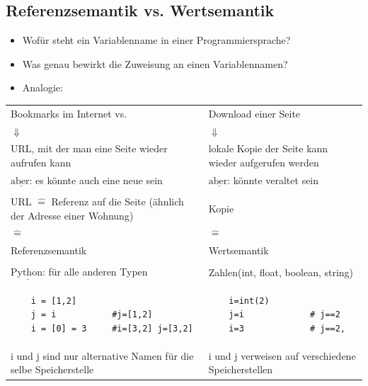 \documentclass[11pt, fleqn]{scrreprt}
\begin{document}
\subsection*{Referenzsemantik vs. Wertsemantik}
    \begin{itemize}[label={-}]
        \item Wofür steht ein Variablenname in einer Programmiersprache?
        \item Was genau bewirkt die Zuweisung an einen Variablennamen?
        \item Analogie:
    \end{itemize}
    \begin{tabular}{C{7cm} C{7cm}}
    Bookmarks im Internet \hspace*{1cm}vs. &  Download einer Seite \\
    $\Downarrow$ & $\Downarrow$ \\
    URL, mit der man eine Seite wieder aufrufen kann & lokale Kopie der Seite
    kann wieder aufgerufen werden \\
    $\underline{\text{aber:}}$ es könnte auch eine neue sein & $\underline{\text{aber:}}$ könnte veraltet sein \\
    & \\
    URL $\widehat{=}$ Referenz auf die Seite (ähnlich der Adresse einer Wohnung) & Kopie \\
    $\widehat{=}$ & $\widehat{=}$ \\
    Referenzsemantik & Wertsemantik \\
     & \\
    $ \underline{\text{Python:}}$ für alle anderen Typen & Zahlen(int, float, boolean, string)\\
    \begin{verbatim}
    i = [1,2]
    j = i           #j=[1,2]
    i = [0] = 3     #i=[3,2] j=[3,2]
    \end{verbatim}
                                                         &
    \begin{verbatim}
    i=int(2)
    j=i             # j==2
    i=3             # j==2,
    \end{verbatim}
    \\
    i und j sind nur alternative Namen für die selbe Speicherstelle & i und j verweisen auf verschiedene Speicherstellen \\
    \end{tabular}
\end{document}
